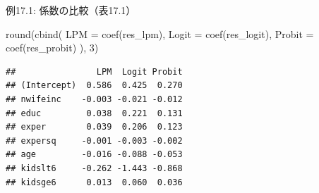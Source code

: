 \documentclass[
  ignorenonframetext,
]{beamer}
\newenvironment{Shaded}{\begin{snugshade}}{\end{snugshade}}
\newcommand{\AttributeTok}[1]{\textcolor[rgb]{0.77,0.63,0.00}{#1}}
\newcommand{\DecValTok}[1]{\textcolor[rgb]{0.00,0.00,0.81}{#1}}
\newcommand{\FunctionTok}[1]{\textcolor[rgb]{0.00,0.00,0.00}{#1}}
\newcommand{\NormalTok}[1]{#1}
\begin{document}
\begin{frame}[fragile]{例17.1: 係数の比較（表17.1）}
\protect\hypertarget{ux4f8b17.1-ux4fc2ux6570ux306eux6bd4ux8f03ux886817.1}{}
\footnotesize

\begin{Shaded}
\begin{Highlighting}[]
\FunctionTok{round}\NormalTok{(}\FunctionTok{cbind}\NormalTok{(}
  \AttributeTok{LPM    =} \FunctionTok{coef}\NormalTok{(res\_lpm),}
  \AttributeTok{Logit  =} \FunctionTok{coef}\NormalTok{(res\_logit),}
  \AttributeTok{Probit =} \FunctionTok{coef}\NormalTok{(res\_probit)}
\NormalTok{), }\DecValTok{3}\NormalTok{)}
\end{Highlighting}
\end{Shaded}

\begin{verbatim}
##                LPM  Logit Probit
## (Intercept)  0.586  0.425  0.270
## nwifeinc    -0.003 -0.021 -0.012
## educ         0.038  0.221  0.131
## exper        0.039  0.206  0.123
## expersq     -0.001 -0.003 -0.002
## age         -0.016 -0.088 -0.053
## kidslt6     -0.262 -1.443 -0.868
## kidsge6      0.013  0.060  0.036
\end{verbatim}

\normalsize
\end{frame}
\end{document}
